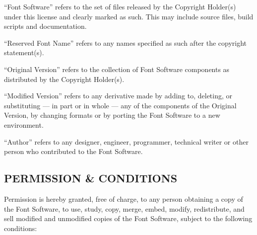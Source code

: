 “Font Software” refers to the set of files released by the Copyright Holder(s) under this license and clearly marked as such. This may include source files, build scripts and documentation.

“Reserved Font Name” refers to any names specified as such after the copyright statement(s).

“Original Version” refers to the collection of Font Software components as distributed by the Copyright Holder(s).

“Modified Version” refers to any derivative made by adding to, deleting, or substituting --- in part or in whole --- any of the components of the Original Version, by changing formats or by porting the Font Software to a new environment.

“Author” refers to any designer, engineer, programmer, technical writer or other person who contributed to the Font Software.

\subsection{PERMISSION \& CONDITIONS}

Permission is hereby granted, free of charge, to any person obtaining a copy of the Font Software, to use, study, copy, merge, embed, modify, redistribute, and sell modified and unmodified copies of the Font Software, subject to the following conditions:


